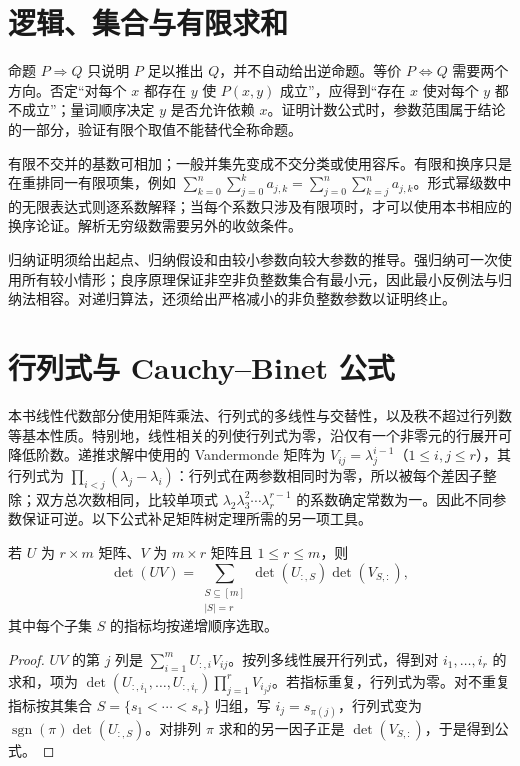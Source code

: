 \documentclass[UTF8,12pt,a4paper,fontset=fandol]{ctexbook}
\begin{document}
\section{逻辑、集合与有限求和}

命题 $P\Rightarrow Q$ 只说明 $P$ 足以推出 $Q$，并不自动给出逆命题。等价 $P\Leftrightarrow Q$ 需要两个方向。否定“对每个 $x$ 都存在 $y$ 使 $P(x,y)$ 成立”，应得到“存在 $x$ 使对每个 $y$ 都不成立”；量词顺序决定 $y$ 是否允许依赖 $x$。证明计数公式时，参数范围属于结论的一部分，验证有限个取值不能替代全称命题。

有限不交并的基数可相加；一般并集先变成不交分类或使用容斥。有限和换序只是在重排同一有限项集，例如 $\sum_{k=0}^n\sum_{j=0}^k a_{j,k}=\sum_{j=0}^n\sum_{k=j}^n a_{j,k}$。形式幂级数中的无限表达式则逐系数解释；当每个系数只涉及有限项时，才可以使用本书相应的换序论证。解析无穷级数需要另外的收敛条件。

归纳证明须给出起点、归纳假设和由较小参数向较大参数的推导。强归纳可一次使用所有较小情形；良序原理保证非空非负整数集合有最小元，因此最小反例法与归纳法相容。对递归算法，还须给出严格减小的非负整数参数以证明终止。

\section{行列式与 Cauchy--Binet 公式}

本书线性代数部分使用矩阵乘法、行列式的多线性与交替性，以及秩不超过行列数等基本性质。特别地，线性相关的列使行列式为零，沿仅有一个非零元的行展开可降低阶数。递推求解中使用的 Vandermonde 矩阵为 $V_{ij}=\lambda_j^{i-1}$（$1\le i,j\le r$），其行列式为 $\prod_{i<j}(\lambda_j-\lambda_i)$：行列式在两参数相同时为零，所以被每个差因子整除；双方总次数相同，比较单项式 $\lambda_2\lambda_3^2\cdots\lambda_r^{r-1}$ 的系数确定常数为一。因此不同参数保证可逆。以下公式补足矩阵树定理所需的另一项工具。

\begin{theorem}
若 $U$ 为 $r\times m$ 矩阵、$V$ 为 $m\times r$ 矩阵且 $1\le r\le m$，则
\[
 \det(UV)=\sum_{\substack{S\subseteq[m]\\|S|=r}}
             \det(U_{:,S})\det(V_{S,:}),
\]
其中每个子集 $S$ 的指标均按递增顺序选取。
\end{theorem}
\begin{proof}
$UV$ 的第 $j$ 列是 $\sum_{i=1}^m U_{:,i}V_{ij}$。按列多线性展开行列式，得到对 $i_1,\ldots,i_r$ 的求和，项为 $\det(U_{:,i_1},\ldots,U_{:,i_r})\prod_{j=1}^r V_{i_jj}$。若指标重复，行列式为零。对不重复指标按其集合 $S=\{s_1<\cdots<s_r\}$ 归组，写 $i_j=s_{\pi(j)}$，行列式变为 $\operatorname{sgn}(\pi)\det(U_{:,S})$。对排列 $\pi$ 求和的另一因子正是 $\det(V_{S,:})$，于是得到公式。
\end{proof}
\end{document}
